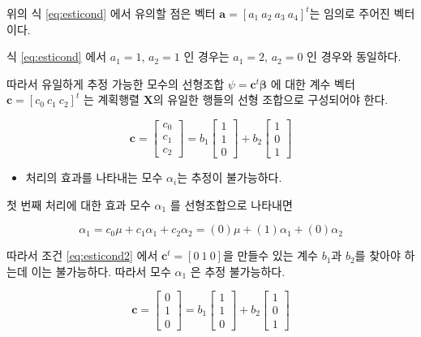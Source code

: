 \documentclass[
]{book}
\makeatletter
\providecommand{\tightlist}{%
  \setlength{\itemsep}{0pt}\setlength{\parskip}{0pt}}
\newcommand{\bm}[1]{\boldsymbol{\mathbf{#1}}}
\newenvironment{kframe}{%
\medskip{}
\setlength{\fboxsep}{.8em}
 \def\at@end@of@kframe{}%
 \ifinner\ifhmode%
  \def\at@end@of@kframe{\end{minipage}}%
  \begin{minipage}{\columnwidth}%
 \fi\fi%
 \def\FrameCommand##1{\hskip\@totalleftmargin \hskip-\fboxsep
 \colorbox{shadecolor}{##1}\hskip-\fboxsep
     \hskip-\linewidth \hskip-\@totalleftmargin \hskip\columnwidth}%
 \MakeFramed {\advance\hsize-\width
   \@totalleftmargin\z@ \linewidth\hsize
   \@setminipage}}%
 {\par\unskip\endMakeFramed%
 \at@end@of@kframe}
\newenvironment{rmdblock}[1]
  {
  \begin{itemize}
  \renewcommand{\labelitemi}{
    \raisebox{-.7\height}[0pt][0pt]{
      {\setkeys{Gin}{width=3em,keepaspectratio}\texttt{[image: images/\#1]}}
    }
  }
  \setlength{\fboxsep}{1em}
  \begin{kframe}
  \item
  }
  {
  \end{kframe}
  \end{itemize}
  }
\newenvironment{rmdnote}
  {\begin{rmdblock}{note}}
  {\end{rmdblock}}
\makeatother
\begin{document}
\begin{rmdnote}
위의 식 \eqref{eq:esticond} 에서 유의할 점은 벡터 \(\bm a=[a_1 ~a_2~a_3~a_4]^t\)는 임의로 주어진 벡터이다.

식 \eqref{eq:esticond} 에서 \(a_1=1\), \(a_2=1\) 인 경우는 \(a_1=2\), \(a_2=0\) 인 경우와 동일하다.
\end{rmdnote}

따라서 유일하게 추정 가능한 모수의 선형조합 \(\psi = \bm c^t \bm \beta\) 에 대한 계수 벡터 \(\bm c =[ c_0 ~ c_1 ~ c_2]^t\) 는 계획행렬 \(\bm X\)의 유일한 행들의 선형 조합으로 구성되어야 한다.

\begin{equation}
\bm c =
\begin{bmatrix}
c_0 \\
c_1 \\
c_2 
\end{bmatrix}
= 
b_1
\begin{bmatrix}
1 \\
1 \\
0 
\end{bmatrix}
+ 
b_2
\begin{bmatrix}
1 \\
0 \\
1 
\end{bmatrix}
\label{eq:esticond2}
\end{equation}

\begin{itemize}
\tightlist
\item
  처리의 효과를 나타내는 모수 \(\alpha_i\)는 추정이 불가능하다.
\end{itemize}

첫 번째 처리에 대한 효과 모수 \(\alpha_1\) 를 선형조합으로 나타내면

\[ \alpha_1 = c_0 \mu + c_1 \alpha_1 + c_2 \alpha_2 = (0) \mu + (1) \alpha_1 + (0) \alpha_2 \]

따라서 조건 \eqref{eq:esticond2} 에서 \(\bm c^t = [0~1~0]\)을 만들수 있는 계수 \(b_1\)과 \(b_2\)를 찾아야 하는데 이는 불가능하다. 따라서 모수 \(\alpha_1\) 은 추정 불가능하다.

\begin{equation*}
\bm c =
\begin{bmatrix}
0 \\
1 \\
0 
\end{bmatrix}
= 
b_1
\begin{bmatrix}
1 \\
1 \\
0 
\end{bmatrix}
+ 
b_2
\begin{bmatrix}
1 \\
0 \\
1 
\end{bmatrix}
\end{equation*}
\end{document}
